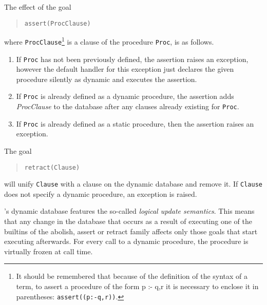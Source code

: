 The effect of the goal
\begin{quote}
\begin{verbatim}
assert(ProcClause)
\end{verbatim}
\end{quote}
where
{\tt ProcClause}\footnote{It should be remembered that because of the
definition of the syntax of a term, to assert a procedure of the form p
:- q,r it is necessary to enclose it in parentheses:
{\tt assert((p:-q,r))}.}
is a clause of the procedure {\tt Proc}, is as follows.
\begin{enumerate}
\item If {\tt Proc} has not been previously defined, the assertion
raises an exception, however the default handler for this exception
just declares the given procedure silently as dynamic and executes
the assertion.

\item If {\tt Proc} is already defined as a dynamic procedure,
the assertion adds {\it ProcClause}
to the database after any clauses already existing for {\tt Proc}.

\item If {\tt Proc} is already defined as a static procedure, then the assertion
raises an exception.
\end{enumerate}

\noindent
The goal 
\begin{quote}
\begin{verbatim}
retract(Clause)
\end{verbatim} 
\end{quote}
will unify {\tt Clause} with a clause on the dynamic database and remove it.
If {\tt Clause} does not specify a dynamic procedure, an exception is raised.

{\eclipse}'s dynamic database features the so-called {\it logical update semantics}.
This means that any change in the database that occurs as a result of
executing one of the builtins of the abolish, assert or retract family
affects only those goals that start executing
afterwards. For every call to a dynamic procedure, the procedure is
virtually frozen at call time.

